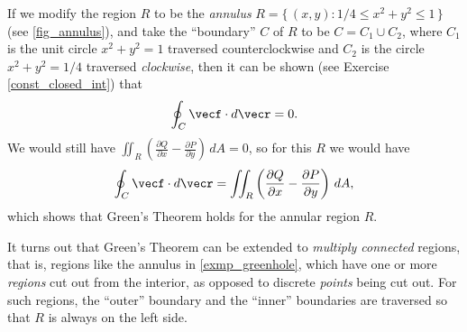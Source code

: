 If we modify the region $R$ to be the \emph{annulus} $R =\lbrace\,(x,y): 1/4 \le x^2 + y^2 \le 1\,\rbrace$ (see \autoref{fig_annulus}), and take the ``boundary'' $C$ of $R$ to be $C = C_1 \cup C_2$, where $C_1$ is the unit circle $x^2 + y^2 = 1$ traversed counterclockwise and $C_2$ is the circle $x^2 + y^2 = 1/4$ traversed \emph{clockwise}, then it can be shown (see Exercise \ref{const_closed_int}) that
\[\oint_{C}\vecf\cdot d\vecr = 0 .\]
We would still have $\iint_{R} \left( \frac{\partial Q}{\partial x} - \frac{\partial P}{\partial y} \right)\,dA= 0$, so for this $R$ we would have
\[
 \oint_{C}\vecf\cdot d\vecr =
 \iint_{R} \left( \frac{\partial Q}{\partial x} - \frac{\partial P}{\partial y} \right)\,dA ,
\]
which shows that Green's Theorem holds for the annular region $R$.\bigskip

It turns out that Green's Theorem can be extended to \emph{multiply connected} regions, that is, regions like the annulus in \autoref{exmp_greenhole}, which have one or more \emph{regions} cut out from the interior, as opposed to discrete \emph{points} being cut out. For such regions, the ``outer'' boundary and the ``inner'' boundaries are traversed so that $R$ is always on the left side.


